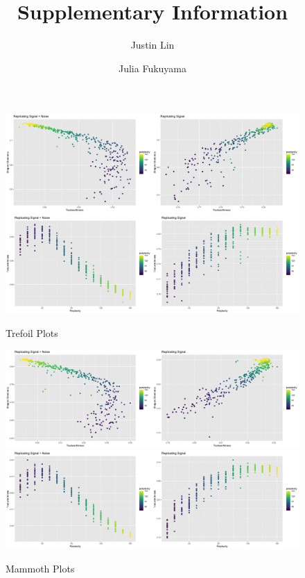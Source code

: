 \documentclass[unnumsec,webpdf,modern,large,namedate]{oup-authoring-template}
\theoremstyle{thmstyleone}%
\theoremstyle{thmstyletwo}%
\theoremstyle{thmstylethree}%
\begin{document}

\title[Supplementary Information]{Supplementary Information}

\author[1]{Justin Lin}
\author[2]{Julia Fukuyama}


\begin{figure}[t]
\centering
\includegraphics[scale=0.28]{trefoil plot}
\includegraphics[scale=0.28]{trust plot (trefoil)}
\caption{Trefoil Plots}
\end{figure}

\begin{figure}[t]
\centering
\includegraphics[scale=0.28]{mammoth plot}
\includegraphics[scale=0.28]{trust plot (mammoth)}
\caption{Mammoth Plots}
\end{figure}
\end{document}
